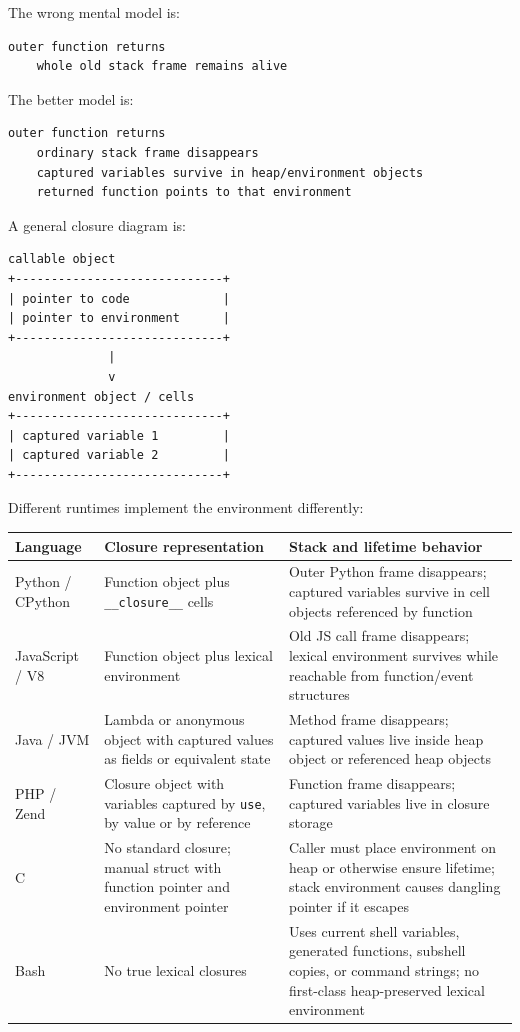 The wrong mental model is:

\begin{verbatim}
outer function returns
    whole old stack frame remains alive
\end{verbatim}

The better model is:

\begin{verbatim}
outer function returns
    ordinary stack frame disappears
    captured variables survive in heap/environment objects
    returned function points to that environment
\end{verbatim}

A general closure diagram is:

\begin{verbatim}
callable object
+-----------------------------+
| pointer to code             |
| pointer to environment      |
+-----------------------------+
              |
              v
environment object / cells
+-----------------------------+
| captured variable 1         |
| captured variable 2         |
+-----------------------------+
\end{verbatim}

Different runtimes implement the environment differently:

\begin{center}
\begin{tabular}{|p{}|p{}|p{}|}
\hline
\textbf{Language} & \textbf{Closure representation} & \textbf{Stack and lifetime behavior} \\
\hline
Python / CPython & Function object plus \texttt{\_\_closure\_\_} cells & Outer Python frame disappears; captured variables survive in cell objects referenced by function \\
\hline
JavaScript / V8 & Function object plus lexical environment & Old JS call frame disappears; lexical environment survives while reachable from function/event structures \\
\hline
Java / JVM & Lambda or anonymous object with captured values as fields or equivalent state & Method frame disappears; captured values live inside heap object or referenced heap objects \\
\hline
PHP / Zend & Closure object with variables captured by \texttt{use}, by value or by reference & Function frame disappears; captured variables live in closure storage \\
\hline
C & No standard closure; manual struct with function pointer and environment pointer & Caller must place environment on heap or otherwise ensure lifetime; stack environment causes dangling pointer if it escapes \\
\hline
Bash & No true lexical closures & Uses current shell variables, generated functions, subshell copies, or command strings; no first-class heap-preserved lexical environment \\
\hline
\end{tabular}
\end{center}

